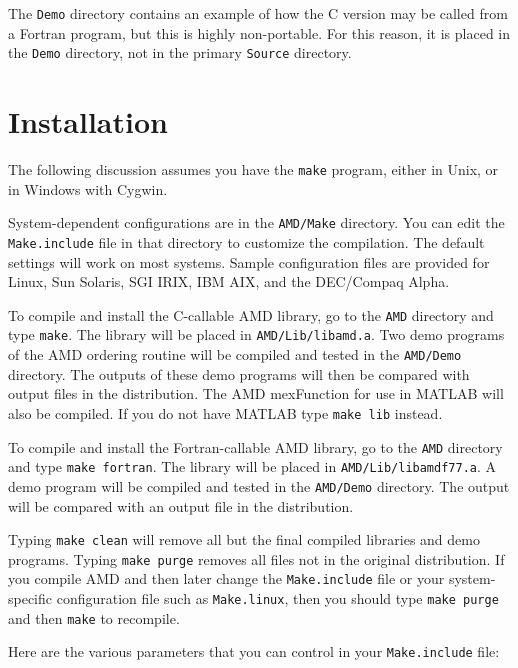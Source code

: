 \documentclass[11pt]{article}
\begin{document}
The {\tt Demo} directory contains an example of how the C version
may be called from a Fortran program, but this is highly non-portable.
For this reason, it is placed in the {\tt Demo} directory, not in the
primary {\tt Source} directory.

\section{Installation}
\label{Install}

The following discussion assumes you have the {\tt make} program, either in
Unix, or in Windows with Cygwin.

System-dependent configurations are in the {\tt AMD/Make}
directory.  You can edit the {\tt Make.include}
file in that directory to customize the compilation.  The default
settings will work on most systems.
Sample configuration files are provided
for Linux, Sun Solaris, SGI IRIX, IBM AIX, and the DEC/Compaq Alpha.

To compile and install the C-callable AMD library,
go to the {\tt AMD} directory and type {\tt make}.
The library will be placed in {\tt AMD/Lib/libamd.a}.
Two demo programs of the AMD ordering routine will be compiled and tested in
the {\tt AMD/Demo} directory.
The outputs of these demo programs will then be compared with output
files in the distribution.  The AMD mexFunction for
use in MATLAB will also be compiled.  If you do not have MATLAB
type {\tt make lib} instead.

To compile and install the Fortran-callable AMD library,
go to the {\tt AMD} directory and type {\tt make fortran}.
The library will be placed in {\tt AMD/Lib/libamdf77.a}.
A demo program will be compiled and tested in the {\tt AMD/Demo} directory.
The output will be compared with an output file in the distribution.

Typing {\tt make clean} will remove all but the final compiled libraries
and demo programs.  Typing {\tt make purge} removes all files not in the
original distribution.
If you compile AMD and then later change the {\tt Make.include}
file or your system-specific configuration file such as {\tt Make.linux},
then you should type {\tt make purge} and then {\tt make} to recompile.

Here are the various parameters that you can control in your
{\tt Make.include} file:
\end{document}
